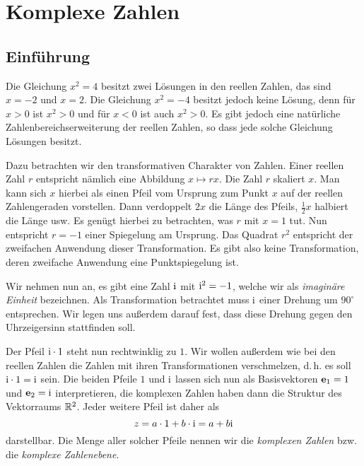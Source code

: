 
\chapter{Komplexe Zahlen}

\section{Einführung}

Die Gleichung $x^2=4$ besitzt zwei Lösungen in den reellen Zahlen,
das sind $x=-2$ und $x=2$. Die Gleichung $x^2=-4$ besitzt jedoch
keine Lösung, denn für $x>0$ ist $x^2>0$ und für $x<0$ ist auch
$x^2>0$. Es gibt jedoch eine natürliche Zahlenbereichserweiterung
der reellen Zahlen, so dass jede solche Gleichung Lösungen besitzt.

Dazu betrachten wir den transformativen Charakter von Zahlen.
Einer reellen Zahl $r$ entspricht nämlich eine Abbildung
$x\mapsto rx$. Die Zahl $r$ skaliert $x$. Man kann sich $x$ hierbei
als einen Pfeil vom Ursprung zum Punkt $x$ auf der reellen
Zahlengeraden vorstellen. Dann verdoppelt $2x$ die Länge des
Pfeils, $\frac{1}{2}x$ halbiert die Länge usw. Es genügt hierbei
zu betrachten, was $r$ mit $x=1$ tut. Nun entspricht $r=-1$ einer
Spiegelung am Ursprung. Das Quadrat $r^2$ entspricht der zweifachen
Anwendung dieser Transformation. Es gibt also keine Transformation,
deren zweifache Anwendung eine Punktspiegelung ist.

Wir nehmen nun an, es gibt eine Zahl $\mathrm{i}$ mit $\mathrm{i}^2=-1$, welche
wir als \emph{imaginäre Einheit} bezeichnen. Als Transformation
betrachtet muss $\mathrm{i}$ einer Drehung um $90^\circ$ entsprechen.
Wir legen uns außerdem darauf fest, dass diese Drehung gegen
den Uhrzeigersinn stattfinden soll.

Der Pfeil $\mathrm{i}\cdot 1$ steht nun rechtwinklig zu $1$. Wir wollen
außerdem wie bei den reellen Zahlen die Zahlen mit ihren
Transformationen verschmelzen, d.\,h. es soll
$\mathrm{i}\cdot 1=\mathrm{i}$ sein. Die beiden Pfeile $1$  und $\mathrm{i}$ lassen sich
nun als Basisvektoren $\mathbf{e}_1=1$ und $\mathbf{e}_2=\mathrm{i}$ interpretieren,
die komplexen Zahlen haben dann die Struktur des Vektorraums $\mathbb R^2$.
Jeder weitere Pfeil ist daher als
\[z = a\cdot 1+b\cdot\mathrm{i} = a+b\mathrm{i}\]
darstellbar. Die Menge aller solcher Pfeile nennen wir die
\emph{komplexen Zahlen} bzw. die \emph{komplexe Zahlenebene}.

